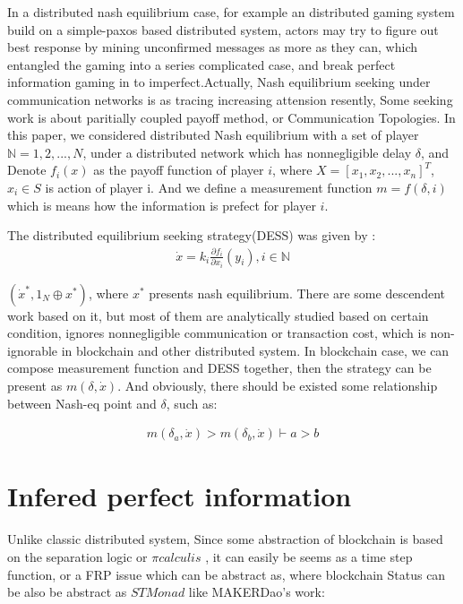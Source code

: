 \documentclass[twocolumn]{article}
\begin{document}
In a distributed nash equilibrium case, for example an distributed gaming system build on a simple-paxos based distributed system, actors may try to figure out best response by mining unconfirmed messages as more as they can, which entangled the gaming into a series complicated case, and break perfect information gaming in to imperfect.Actually, Nash equilibrium seeking under communication networks is as tracing increasing attension resently, Some seeking work is about paritially coupled payoff method\cite{8029164}, or Communication Topologies\cite{8093754}. In this paper, we considered distributed Nash equilibrium with a set of player $\mathbb{N} = {1, 2, ..., N}$, under a distributed network which has nonnegligible delay $\mathbb{\delta}$, and Denote $f_i(x)$ as the payoff function of player $i$, where $X = [x_1, x_2, ..., x_n]^T$, $x_i \in S$ is action of player i. And we define a measurement function $m = f(\delta, i)$ which is means how the information is prefect for player $i$.

The distributed equilibrium seeking strategy(DESS) was given by \cite{7888532}:
\begin{gather}
  \dot{x} = k_i \frac {\partial f_i}{\partial x_i}(y_i), i \in \mathbb{N}
\end{gather}

$(\dot{x}^*, 1_N\oplus x^*)$, where $x^*$ presents nash equilibrium. There are some descendent work based on it, but most of them are analytically studied based on certain condition, ignores nonnegligible communication or transaction cost, which is non-ignorable in blockchain and other distributed system. In blockchain case, we can compose measurement function and DESS together, then the strategy can be present as $m(\delta, \dot{x})$. And obviously, there should be existed some relationship between Nash-eq point and $\delta$, such as:

\begin{gather}
  m(\delta_a, \dot{x}) > m(\delta_b, \dot{x}) \vdash a > b
\end{gather}

\section{Infered perfect information}

Unlike classic distributed system,
Since some abstraction of blockchain is based on the separation logic or $\pi calculis$ \cite{linearblockchain}, it can easily be seems as a time step function, or a FRP issue which can be abstract as\cite{ElliottHudak97:Fran}, where blockchain Status can be also be abstract as $STMonad$ like MAKERDao\cite{dai}'s work:
\end{document}
